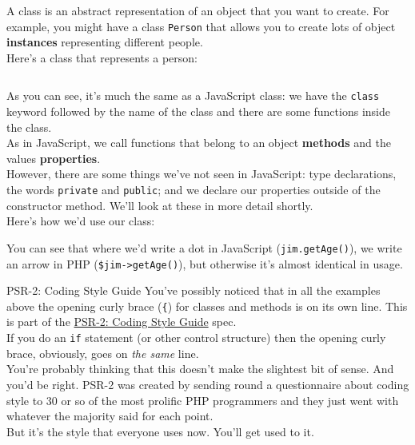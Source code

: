 A class is an abstract representation of an object that you want to create. For example, you might have a class \texttt{Person} that allows you to create lots of object \textbf{instances} representing different people.
\\

Here's a class that represents a person:

\inputminted{php}{02/figures/02/01-class.php}

As you can see, it's much the same as a JavaScript class: we have the \texttt{class} keyword followed by the name of the class and there are some functions inside the class.
\\

As in JavaScript, we call functions that belong to an object \textbf{methods} and the values \textbf{properties}.
\\

However, there are some things we've not seen in JavaScript: type declarations, the words \texttt{private} and \texttt{public}; and we declare our properties outside of the constructor method. We'll look at these in more detail shortly.
\\

Here's how we'd use our class:


You can see that where we'd write a dot in JavaScript (\texttt{jim.getAge()}), we write an arrow in PHP (\texttt{\$jim->getAge()}), but otherwise it's almost identical in usage.

\begin{infobox}{PSR-2: Coding Style Guide}
    You've possibly noticed that in all the examples above the opening curly brace (\texttt{\{}) for classes and methods is on its own line. This is part of the \href{https://www.php-fig.org/psr/psr-2/}{PSR-2: Coding Style Guide} spec.
    \\

    If you do an \texttt{if} statement (or other control structure) then the opening curly brace, obviously, goes on \textit{the same} line.
    \\

    You're probably thinking that this doesn't make the slightest bit of sense. And you'd be right. PSR-2 was created by sending round a questionnaire about coding style to 30 or so of the most prolific PHP programmers and they just went with whatever the majority said for each point.
    \\

    But it's the style that everyone uses now. You'll get used to it.
\end{infobox}


